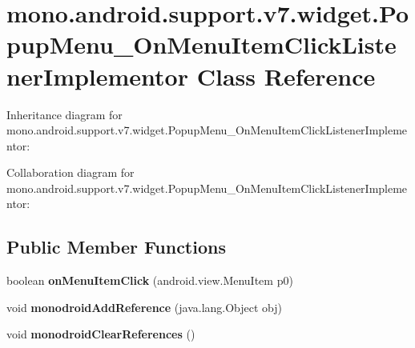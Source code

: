 \hypertarget{classmono_1_1android_1_1support_1_1v7_1_1widget_1_1_popup_menu___on_menu_item_click_listener_implementor}{}\section{mono.\+android.\+support.\+v7.\+widget.\+Popup\+Menu\+\_\+\+On\+Menu\+Item\+Click\+Listener\+Implementor Class Reference}
\label{classmono_1_1android_1_1support_1_1v7_1_1widget_1_1_popup_menu___on_menu_item_click_listener_implementor}


Inheritance diagram for mono.\+android.\+support.\+v7.\+widget.\+Popup\+Menu\+\_\+\+On\+Menu\+Item\+Click\+Listener\+Implementor\+:


Collaboration diagram for mono.\+android.\+support.\+v7.\+widget.\+Popup\+Menu\+\_\+\+On\+Menu\+Item\+Click\+Listener\+Implementor\+:
\subsection*{Public Member Functions}
\begin{DoxyCompactItemize}
\item 
\mbox{\label{classmono_1_1android_1_1support_1_1v7_1_1widget_1_1_popup_menu___on_menu_item_click_listener_implementor_a62249f352c854b62e49a42bc6ea79c70}} 
boolean {\bfseries on\+Menu\+Item\+Click} (android.\+view.\+Menu\+Item p0)
\item 
\mbox{\label{classmono_1_1android_1_1support_1_1v7_1_1widget_1_1_popup_menu___on_menu_item_click_listener_implementor_a10bc60fb24f62110461d25542b950567}} 
void {\bfseries monodroid\+Add\+Reference} (java.\+lang.\+Object obj)
\item 
\mbox{\label{classmono_1_1android_1_1support_1_1v7_1_1widget_1_1_popup_menu___on_menu_item_click_listener_implementor_afb02baf1ac72557754370a95de87f423}} 
void {\bfseries monodroid\+Clear\+References} ()
\end{DoxyCompactItemize}
